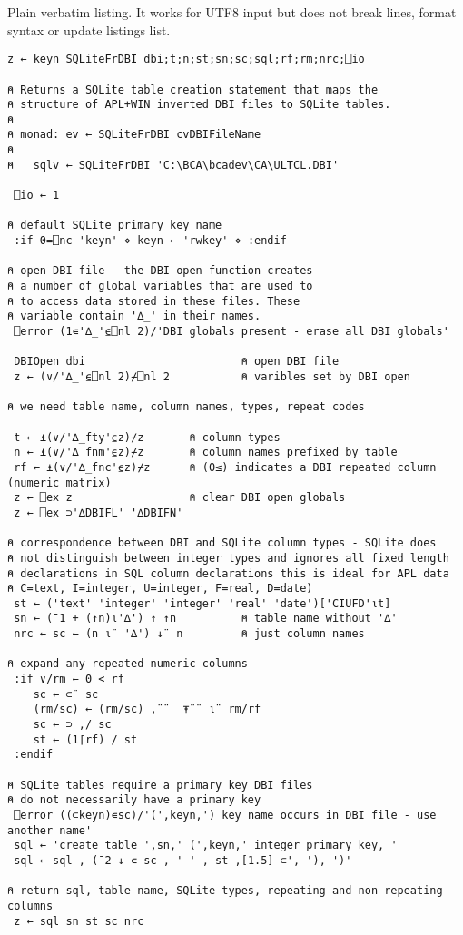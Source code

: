 \documentclass{article}
\begin{document}
Plain verbatim listing. It works for UTF8 input but does not break
lines, format syntax or update listings list.

\begin{verbatim}
z ← keyn SQLiteFrDBI dbi;t;n;st;sn;sc;sql;rf;rm;nrc;⎕io

⍝ Returns a SQLite table creation statement that maps the
⍝ structure of APL+WIN inverted DBI files to SQLite tables.
⍝
⍝ monad: ev ← SQLiteFrDBI cvDBIFileName
⍝
⍝   sqlv ← SQLiteFrDBI 'C:\BCA\bcadev\CA\ULTCL.DBI'

 ⎕io ← 1

⍝ default SQLite primary key name
 :if 0=⎕nc 'keyn' ⋄ keyn ← 'rwkey' ⋄ :endif

⍝ open DBI file - the DBI open function creates
⍝ a number of global variables that are used to
⍝ to access data stored in these files. These
⍝ variable contain '∆_' in their names.
 ⎕error (1∊'∆_'⍷⎕nl 2)/'DBI globals present - erase all DBI globals'

 DBIOpen dbi                        ⍝ open DBI file
 z ← (∨/'∆_'⍷⎕nl 2)⌿⎕nl 2           ⍝ varibles set by DBI open

⍝ we need table name, column names, types, repeat codes

 t ← ⍎(∨/'∆_fty'⍷z)⌿z       ⍝ column types
 n ← ⍎(∨/'∆_fnm'⍷z)⌿z       ⍝ column names prefixed by table
 rf ← ⍎(∨/'∆_fnc'⍷z)⌿z      ⍝ (0≤) indicates a DBI repeated column (numeric matrix)
 z ← ⎕ex z                  ⍝ clear DBI open globals
 z ← ⎕ex ⊃'∆DBIFL' '∆DBIFN'

⍝ correspondence between DBI and SQLite column types - SQLite does
⍝ not distinguish between integer types and ignores all fixed length
⍝ declarations in SQL column declarations this is ideal for APL data
⍝ C=text, I=integer, U=integer, F=real, D=date)
 st ← ('text' 'integer' 'integer' 'real' 'date')['CIUFD'⍳t]
 sn ← (¯1 + (↑n)⍳'∆') ↑ ↑n          ⍝ table name without '∆'
 nrc ← sc ← (n ⍳¨ '∆') ↓¨ n         ⍝ just column names

⍝ expand any repeated numeric columns
 :if ∨/rm ← 0 < rf
    sc ← ⊂¨ sc
    (rm/sc) ← (rm/sc) ,¨¨  ⍕¨¨ ⍳¨ rm/rf
    sc ← ⊃ ,/ sc
    st ← (1⌈rf) / st
 :endif

⍝ SQLite tables require a primary key DBI files
⍝ do not necessarily have a primary key
 ⎕error ((⊂keyn)∊sc)/'(',keyn,') key name occurs in DBI file - use another name'
 sql ← 'create table ',sn,' (',keyn,' integer primary key, '
 sql ← sql , (¯2 ↓ ∊ sc , ' ' , st ,[1.5] ⊂', '), ')'

⍝ return sql, table name, SQLite types, repeating and non-repeating columns
 z ← sql sn st sc nrc
\end{verbatim}
\end{document}
